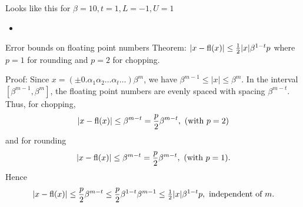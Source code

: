 \documentclass{beamer}
\begin{document}
\begin{frame}{Looks like this for $\beta=10, t=1, L=-1, U=1$}
\begin{itemize}
\item {}
\end{itemize}
\end{frame}


\begin{frame}{Error bounds on floating point numbers}
Theorem: $|x - \text{fl}(x)| \leq \tfrac{1}{2} |x| \beta^{1-t} p$
where $p=1$ for rounding and $p=2$ for chopping.

Proof: Since $x = (\pm 0.\alpha_1 \alpha_2 \ldots \alpha_t \ldots) \beta^m$, we have
$\beta^{m-1} \leq |x| \leq \beta^m$. In the interval $[\beta^{m-1}, \beta^m]$, the floating point numbers
are evenly spaced with spacing $\beta^{m - t}$. Thus, for chopping,
\begin{equation*}
|x - \text{fl}(x)| \leq \beta^{m - t} = \frac{p}{2} \beta^{m-t}, \text{ (with $p = 2$)}
\end{equation*}
and for rounding
\begin{equation*}
|x - \text{fl}(x)| \leq \beta^{m - t} = \frac{p}{2} \beta^{m-t}, \text{ (with $p = 1$)}.
\end{equation*}
Hence
\begin{equation*}
|x - \text{fl}(x)| \leq \frac{p}{2} \beta^{m - t} \leq \frac{p}{2} \beta^{1-t} \beta^{m-1} \leq \tfrac{1}{2} |x| \beta^{1-t} p,\text{ independent of $m$}.
\end{equation*}
\end{frame}
\end{document}
